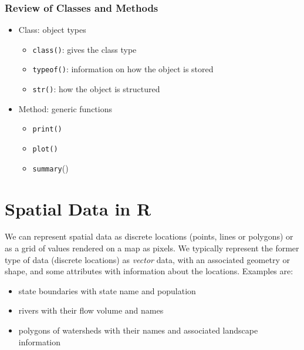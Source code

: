 \documentclass[
]{book}
\providecommand{\tightlist}{%
  \setlength{\itemsep}{0pt}\setlength{\parskip}{0pt}}
\begin{document}
\hypertarget{review-of-classes-and-methods}{%
\subsubsection{\texorpdfstring{\textbf{Review of Classes and Methods}}{Review of Classes and Methods}}\label{review-of-classes-and-methods}}

\begin{itemize}
\tightlist
\item
  Class: object types

  \begin{itemize}
  \tightlist
  \item
    \texttt{class()}: gives the class type
  \item
    \texttt{typeof()}: information on how the object is stored
  \item
    \texttt{str()}: how the object is structured
  \end{itemize}
\item
  Method: generic functions

  \begin{itemize}
  \tightlist
  \item
    \texttt{print()}
  \item
    \texttt{plot()}
  \item
    \texttt{summary}()
  \end{itemize}
\end{itemize}

\hypertarget{spatial-data-in-r}{%
\section{Spatial Data in R}\label{spatial-data-in-r}}

We can represent spatial data as discrete locations (points, lines or polygons) or as a grid of values rendered on a map as pixels. We typically represent the former type of data (discrete locations) as \emph{vector} data, with an associated geometry or shape, and some attributes with information about the locations. Examples are:

\begin{itemize}
\tightlist
\item
  state boundaries with state name and population
\item
  rivers with their flow volume and names
\item
  polygons of watersheds with their names and associated landscape information
\end{itemize}
\end{document}
